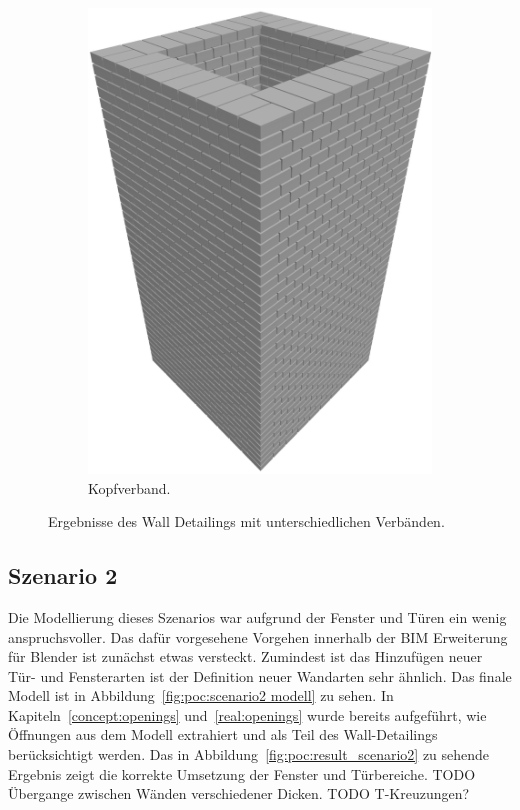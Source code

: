 \begin{figure}[htb]
\begin{subfigure}[b]{0.3\columnwidth}
      \includegraphics[width=\columnwidth]{fig/scenario1_render_headbond.png}
      \caption{Kopfverband.}\label{fig:poc:render_headbond}
    \end{subfigure}
    \caption{Ergebnisse des Wall Detailings mit unterschiedlichen Verbänden.}\label{fig:poc:result_scenario1}
\end{figure}

\subsection{Szenario 2}\label{poc:scenario2}
Die Modellierung dieses Szenarios war aufgrund der Fenster und Türen ein wenig anspruchsvoller.
Das dafür vorgesehene Vorgehen innerhalb der BIM Erweiterung für Blender ist zunächst etwas versteckt.
Zumindest ist das Hinzufügen neuer Tür- und Fensterarten ist der Definition neuer Wandarten sehr ähnlich.
Das finale Modell ist in Abbildung~\ref{fig:poc:scenario2 modell} zu sehen.
In Kapiteln~\ref{concept:openings} und~\ref{real:openings} wurde bereits aufgeführt, wie Öffnungen aus dem Modell extrahiert und als Teil des Wall-Detailings berücksichtigt werden.
Das in Abbildung~\ref{fig:poc:result_scenario2} zu sehende Ergebnis zeigt die korrekte Umsetzung der Fenster und Türbereiche.
TODO Übergange zwischen Wänden verschiedener Dicken.
TODO T-Kreuzungen?

